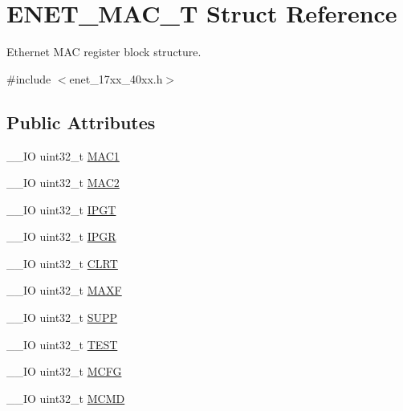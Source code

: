 \hypertarget{struct_e_n_e_t___m_a_c___t}{\section{E\+N\+E\+T\+\_\+\+M\+A\+C\+\_\+\+T Struct Reference}
\label{struct_e_n_e_t___m_a_c___t}
}


Ethernet M\+A\+C register block structure.  




{\ttfamily \#include $<$enet\+\_\+17xx\+\_\+40xx.\+h$>$}

\subsection*{Public Attributes}
\begin{DoxyCompactItemize}
\item 
\+\_\+\+\_\+\+I\+O uint32\+\_\+t \hyperlink{struct_e_n_e_t___m_a_c___t_a1e758365774fda3ac9c11922c4a7ef35}{M\+A\+C1}
\item 
\+\_\+\+\_\+\+I\+O uint32\+\_\+t \hyperlink{struct_e_n_e_t___m_a_c___t_a925a92dbe2a48105e6497378a8cdfcac}{M\+A\+C2}
\item 
\+\_\+\+\_\+\+I\+O uint32\+\_\+t \hyperlink{struct_e_n_e_t___m_a_c___t_ac73d8d2cf290a3b9dc117340fc093d7e}{I\+P\+G\+T}
\item 
\+\_\+\+\_\+\+I\+O uint32\+\_\+t \hyperlink{struct_e_n_e_t___m_a_c___t_adcccddf8623def0f5a9aeee408312664}{I\+P\+G\+R}
\item 
\+\_\+\+\_\+\+I\+O uint32\+\_\+t \hyperlink{struct_e_n_e_t___m_a_c___t_afdf0e932f04510c6e77bb13a4592cf13}{C\+L\+R\+T}
\item 
\+\_\+\+\_\+\+I\+O uint32\+\_\+t \hyperlink{struct_e_n_e_t___m_a_c___t_a5e6d2bc05984b815f245d2ebd3c067a3}{M\+A\+X\+F}
\item 
\+\_\+\+\_\+\+I\+O uint32\+\_\+t \hyperlink{struct_e_n_e_t___m_a_c___t_ad7232a883f980074136d81f8a15d8bb5}{S\+U\+P\+P}
\item 
\+\_\+\+\_\+\+I\+O uint32\+\_\+t \hyperlink{struct_e_n_e_t___m_a_c___t_a3ba308b4a368f475aa4b2136faa88f6f}{T\+E\+S\+T}
\item 
\+\_\+\+\_\+\+I\+O uint32\+\_\+t \hyperlink{struct_e_n_e_t___m_a_c___t_a1e733caa47928bbd88205c10549db3b6}{M\+C\+F\+G}
\item 
\+\_\+\+\_\+\+I\+O uint32\+\_\+t \hyperlink{struct_e_n_e_t___m_a_c___t_af5015dd00c915a85f7aa387444349f59}{M\+C\+M\+D}
\item 

\end{DoxyCompactItemize}
